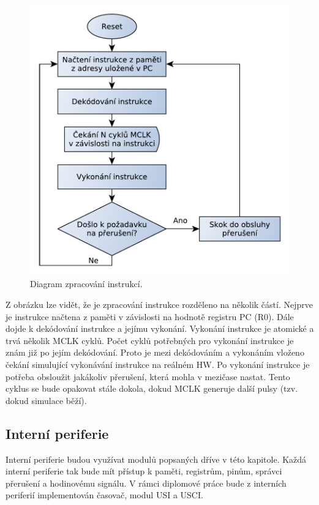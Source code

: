 \begin{figure}[h]
\centering
\includegraphics[trim=0cm 0cm 0cm 0cm, scale=0.7]{fig/msp430_inst}
\caption{Diagram zpracování instrukcí.}
\label{fig:msp430_inst}
\end{figure}

Z obrázku lze vidět, že je zpracování instrukce rozděleno na několik částí. Nejprve je instrukce načtena z paměti v závislosti na hodnotě registru PC (R0).
Dále dojde k dekódování instrukce a jejímu vykonání. Vykonání instrukce je atomické a trvá několik MCLK cyklů. Počet cyklů potřebných pro vykonání
instrukce je znám již po jejím dekódování. Proto je mezi dekódováním a vykonáním vloženo čekání simulující vykonávání instrukce na reálném HW.
Po vykonání instrukce je potřeba obsloužit jakákoliv přerušení, která mohla v mezičase nastat. Tento cyklus se bude opakovat stále dokola, dokud MCLK generuje další pulsy (tzv. dokud simulace běží).

\subsection{Interní periferie}

Interní periferie budou využívat modulů popsaných dříve v této kapitole. Každá interní periferie tak bude mít přístup k paměti, registrům, pinům, správci
přerušení a hodinovému signálu. V rámci diplomové práce bude z interních periferií implementován časovač, modul USI a USCI.

